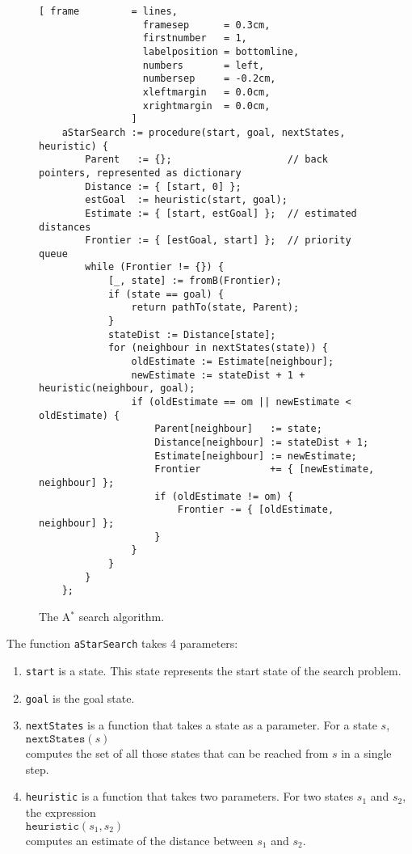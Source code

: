 \begin{figure}[!ht]
\centering
\begin{Verbatim}[ frame         = lines, 
                  framesep      = 0.3cm, 
                  firstnumber   = 1,
                  labelposition = bottomline,
                  numbers       = left,
                  numbersep     = -0.2cm,
                  xleftmargin   = 0.0cm,
                  xrightmargin  = 0.0cm,
                ]
    aStarSearch := procedure(start, goal, nextStates, heuristic) {
        Parent   := {};                    // back pointers, represented as dictionary
        Distance := { [start, 0] };
        estGoal  := heuristic(start, goal);
        Estimate := { [start, estGoal] };  // estimated distances
        Frontier := { [estGoal, start] };  // priority queue
        while (Frontier != {}) {
            [_, state] := fromB(Frontier);
            if (state == goal) {
                return pathTo(state, Parent);
            }
            stateDist := Distance[state];
            for (neighbour in nextStates(state)) {
                oldEstimate := Estimate[neighbour];
                newEstimate := stateDist + 1 + heuristic(neighbour, goal);
                if (oldEstimate == om || newEstimate < oldEstimate) {
                    Parent[neighbour]   := state;
                    Distance[neighbour] := stateDist + 1;
                    Estimate[neighbour] := newEstimate;
                    Frontier            += { [newEstimate, neighbour] };
                    if (oldEstimate != om) {
                        Frontier -= { [oldEstimate, neighbour] };
                    }
                }
            }
        }
    };
\end{Verbatim}
\vspace*{-0.3cm}
\caption{The A$^*$ search algorithm.}
\label{fig:a-star-search.stlx}
\end{figure}
\noindent
The function \texttt{aStarSearch} takes 4 parameters:
\begin{enumerate}
\item \texttt{start} is a state.  This state represents the start state of the search problem.
\item \texttt{goal} is the goal state.  
\item \texttt{nextStates} is a function that takes a state as a parameter.  For a state $s$,
      \\[0.2cm]
      \hspace*{1.3cm}
      $\mathtt{nextStates}(s)$
      \\[0.2cm]
      computes the set of all those states that can be reached from $s$ in a single step.
\item \texttt{heuristic} is a function that takes two parameters.  
      For two states $s_1$ and $s_2$, the expression
      \\[0.2cm]
      \hspace*{1.3cm}
      $\texttt{heuristic}(s_1, s_2)$ 
      \\[0.2cm]
      computes an estimate of the distance between $s_1$ and $s_2$.
\end{enumerate}
